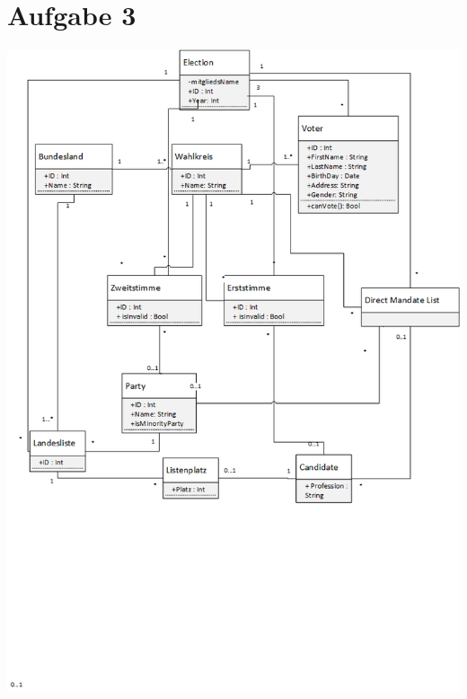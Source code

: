 \documentclass[10pt,a4paper]{article}
\begin{document}
\section*{Aufgabe 3}
\includegraphics[scale=.8]{../Wahlschema.png}
\end{document}
